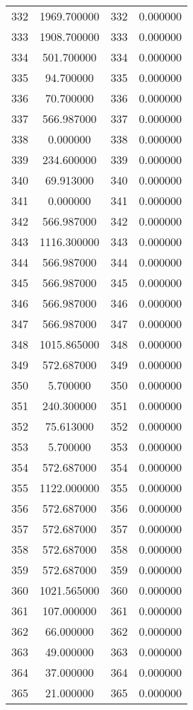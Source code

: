 \documentclass[12pt]{article}
\begin{document}
\begin{longtable}{@{}cccc@{}}
332 & 1969.700000 & 332 & 0.000000 \\
333 & 1908.700000 & 333 & 0.000000 \\
334 & 501.700000 & 334 & 0.000000 \\
335 & 94.700000 & 335 & 0.000000 \\
336 & 70.700000 & 336 & 0.000000 \\
337 & 566.987000 & 337 & 0.000000 \\
338 & 0.000000 & 338 & 0.000000 \\
339 & 234.600000 & 339 & 0.000000 \\
340 & 69.913000 & 340 & 0.000000 \\
341 & 0.000000 & 341 & 0.000000 \\
342 & 566.987000 & 342 & 0.000000 \\
343 & 1116.300000 & 343 & 0.000000 \\
344 & 566.987000 & 344 & 0.000000 \\
345 & 566.987000 & 345 & 0.000000 \\
346 & 566.987000 & 346 & 0.000000 \\
347 & 566.987000 & 347 & 0.000000 \\
348 & 1015.865000 & 348 & 0.000000 \\
349 & 572.687000 & 349 & 0.000000 \\
350 & 5.700000 & 350 & 0.000000 \\
351 & 240.300000 & 351 & 0.000000 \\
352 & 75.613000 & 352 & 0.000000 \\
353 & 5.700000 & 353 & 0.000000 \\
354 & 572.687000 & 354 & 0.000000 \\
355 & 1122.000000 & 355 & 0.000000 \\
356 & 572.687000 & 356 & 0.000000 \\
357 & 572.687000 & 357 & 0.000000 \\
358 & 572.687000 & 358 & 0.000000 \\
359 & 572.687000 & 359 & 0.000000 \\
360 & 1021.565000 & 360 & 0.000000 \\
361 & 107.000000 & 361 & 0.000000 \\
362 & 66.000000 & 362 & 0.000000 \\
363 & 49.000000 & 363 & 0.000000 \\
364 & 37.000000 & 364 & 0.000000 \\
365 & 21.000000 & 365 & 0.000000 \\

\end{longtable}
\end{document}
